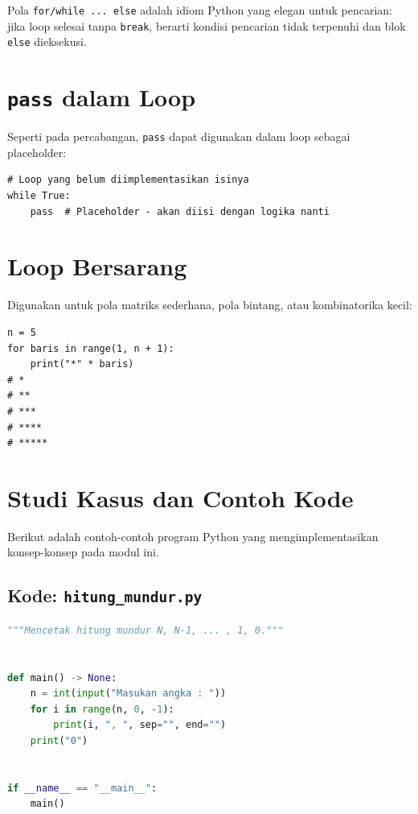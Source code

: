 ﻿\documentclass[../main.tex]{subfiles}
\begin{document}
\begin{konsep}
Pola \texttt{for/while ... else} adalah idiom Python yang elegan untuk pencarian: jika loop selesai tanpa \texttt{break}, berarti kondisi pencarian tidak terpenuhi dan blok \texttt{else} dieksekusi.
\end{konsep}

\section{\texttt{pass} dalam Loop}

Seperti pada percabangan, \texttt{pass} dapat digunakan dalam loop sebagai placeholder:

\begin{lstlisting}[caption=pass dalam loop]
# Loop yang belum diimplementasikan isinya
while True:
    pass  # Placeholder - akan diisi dengan logika nanti
\end{lstlisting}

\section{Loop Bersarang}

Digunakan untuk pola matriks sederhana, pola bintang, atau kombinatorika kecil:

\begin{lstlisting}[caption=Pola bintang dengan loop bersarang]
n = 5
for baris in range(1, n + 1):
    print("*" * baris)
# *
# **
# ***
# ****
# *****
\end{lstlisting}

\section{Studi Kasus dan Contoh Kode}

Berikut adalah contoh-contoh program Python yang mengimplementasikan konsep-konsep pada modul ini.

\subsection{Kode: \texttt{hitung\_mundur.py}}
\introstudikasuskode
\begin{lstlisting}[language=Python,caption={\texttt{hitung\_mundur.py}}]
"""Mencetak hitung mundur N, N-1, ... , 1, 0."""


def main() -> None:
    n = int(input("Masukan angka : "))
    for i in range(n, 0, -1):
        print(i, ", ", sep="", end="")
    print("0")


if __name__ == "__main__":
    main()
\end{lstlisting}
\end{document}
